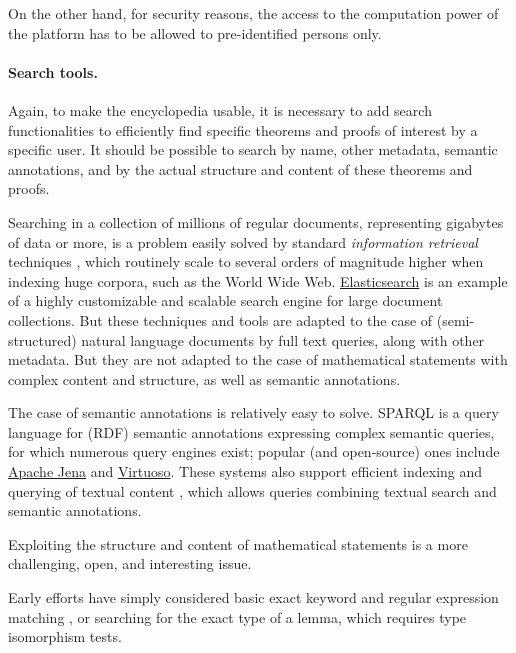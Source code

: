On the other hand, for security reasons, the access to the computation
power of the platform has to be allowed to pre-identified persons only.

\paragraph*{Search tools.}

Again, to make the encyclopedia usable, it is necessary to add search
functionalities to efficiently find specific theorems and proofs of
interest by a specific user. It should be possible to search by name,
other metadata, semantic annotations, and by the actual structure and
content of these theorems and proofs.

Searching in a collection of millions of regular documents,
representing gigabytes of data or more, is a problem easily solved by
standard \emph{information retrieval} techniques
\cite{DBLP:books/daglib/0021593}, which routinely scale to several
orders of magnitude higher when indexing huge corpora, such as the
World Wide Web.
\href{https://www.elastic.co/fr/elasticsearch}{Elasticsearch}
is an example of a highly customizable and scalable search engine for
large document collections. But these techniques and tools are adapted
to the case of (semi-structured) natural language documents by full
text queries, along with other metadata. But they are not adapted to
the case of mathematical statements with complex content and
structure, as well as semantic annotations.

The case of semantic annotations is relatively easy to solve. SPARQL
\cite{sparql} is a
query language for (RDF) semantic annotations expressing complex semantic
queries, for which numerous
query engines exist; popular (and open-source) ones include
\href{https://jena.apache.org/}{Apache Jena} and
\href{http://vos.openlinksw.com/owiki/wiki/VOS}{Virtuoso}. These
systems also support efficient indexing and querying of textual content
\cite{DBLP:conf/esws/MinackSN09}, which allows queries combining textual
search and semantic annotations.

Exploiting the structure and content of mathematical statements is a more
challenging, open, and interesting issue.

Early efforts have simply considered
basic exact keyword and regular expression matching 
\cite{DBLP:conf/mkm/BancerekR03}, or searching for the exact type of a lemma,
which requires type isomorphism tests\cite{DBLP:conf/types/Delahaye99}.

